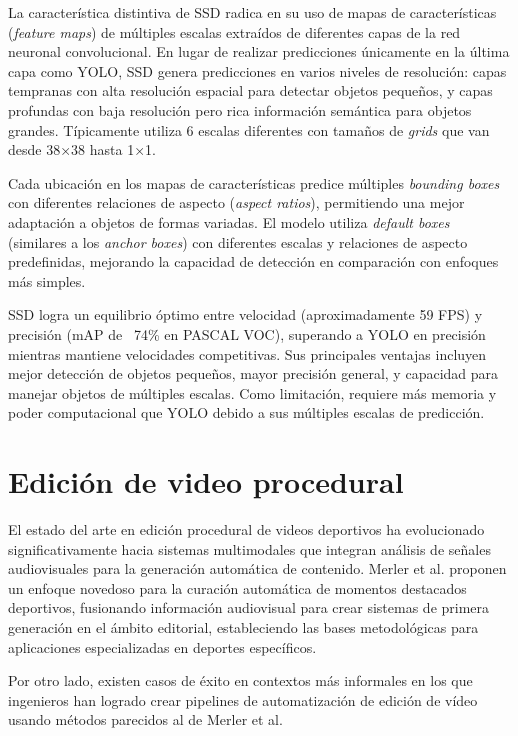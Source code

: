 \begin{description}
	La característica distintiva de SSD radica en su uso de mapas de características (\textit{feature maps}) de múltiples escalas extraídos de diferentes capas de la red neuronal convolucional. En lugar de realizar predicciones únicamente en la última capa como YOLO, SSD genera predicciones en varios niveles de resolución: capas tempranas con alta resolución espacial para detectar objetos pequeños, y capas profundas con baja resolución pero rica información semántica para objetos grandes. Típicamente utiliza 6 escalas diferentes con tamaños de \textit{grids} que van desde 38×38 hasta 1×1.
	
	Cada ubicación en los mapas de características predice múltiples \textit{bounding boxes} con diferentes relaciones de aspecto (\textit{aspect ratios}), permitiendo una mejor adaptación a objetos de formas variadas. El modelo utiliza \textit{default boxes} (similares a los \textit{anchor boxes}) con diferentes escalas y relaciones de aspecto predefinidas, mejorando la capacidad de detección en comparación con enfoques más simples.
	
	SSD logra un equilibrio óptimo entre velocidad (aproximadamente 59 FPS) y precisión (mAP de ~74\% en PASCAL VOC), superando a YOLO en precisión mientras mantiene velocidades competitivas. Sus principales ventajas incluyen mejor detección de objetos pequeños, mayor precisión general, y capacidad para manejar objetos de múltiples escalas. Como limitación, requiere más memoria y poder computacional que YOLO debido a sus múltiples escalas de predicción.
\end{description}

\section[Edición de video procedural]{Edición de video procedural}

El estado del arte en edición procedural de videos deportivos ha evolucionado significativamente hacia sistemas multimodales que integran análisis de señales audiovisuales para la generación automática de contenido. Merler et al\cite{merler2019}. proponen un enfoque novedoso para la curación automática de momentos destacados deportivos, fusionando información audiovisual para crear sistemas de primera generación en el ámbito editorial, estableciendo las bases metodológicas para aplicaciones especializadas en deportes específicos.

Por otro lado, existen casos de éxito en contextos más informales en los que ingenieros han logrado crear pipelines de automatización de edición de vídeo \cite{mediumVideoEditingPython} usando métodos parecidos al de Merler et al.

